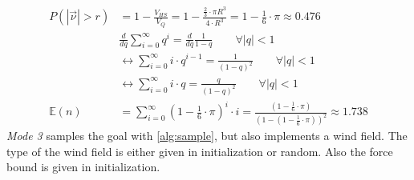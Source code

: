 \begin{align}
	P(|\overrightarrow{\nu}| > r) &= 1 - \frac{V_{HS}}{V_Q} = 1 - \frac{\frac{2}{3} \cdot \pi R^3}{4 \cdot R^3} = 1 - \frac{1}{6} \cdot \pi \approx 0.476 \label{eq:prob}\\
	&\frac{d}{dq} \sum_{i=0}^{\infty} q^i = \frac{d}{dq} \frac{1}{1 - q} \qquad \forall |q| < 1\nonumber\\
	&\leftrightarrow \sum_{i=0}^{\infty} i \cdot q^{i-1} = \frac{1}{(1-q)^2} \qquad \forall |q| < 1 \nonumber\\
	&\leftrightarrow \sum_{i=0}^{\infty} i \cdot q = \frac{q}{(1 - q)^2} \qquad \forall |q| < 1 \\
	\mathbb{E}(n) &= \sum_{i = 0}^{\infty} (1 - \frac{1}{6} \cdot \pi)^i \cdot i  = \frac{ (1 - \frac{1}{6} \cdot \pi)}{(1 -  (1 - \frac{1}{6} \cdot \pi))^2}\approx 1.738 \label{eq:expn}
\end{align}
\emph{Mode 3} samples the goal with \cref{alg:sample}, but also implements a wind field. The type of the wind field is either given in initialization or random. Also the force bound is given in initialization. 
\newpage

